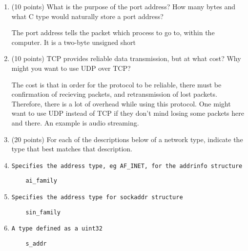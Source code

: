 \documentclass{article}[9pt]
\newenvironment{answerfont}{\fontfamily{qhv}\selectfont}{\par}
\newenvironment{myanswer}{\begin{mdframed}\begin{answerfont}}{\end{answerfont}\end{mdframed}}
\begin{document}
\begin{enumerate}
\begin{enumerate}
  \end{enumerate}

\item (10 points) What is the purpose of the port address? How many bytes and what C type would naturally store a port address?

  \begin{myanswer}
  The port address tells the packet which process to go to, within the computer. It is a two-byte unsigned short
  \end{myanswer}

\item (10 points) TCP provides reliable data transmission, but at what cost? Why might you want to use UDP over TCP?

  \begin{myanswer}
  The cost is that in order for the protocol to be reliable, there must be confirmation of recieving packets, and retransmission of lost packets. Therefore, there is a lot
  of overhead while using this protocol. One might want to use UDP instead of TCP if they don't mind losing some packets here and there. An example is audio streaming.
  \end{myanswer}

\item (20 points) For each of the descriptions below of a network type, indicate the type that best matches that description.

  \item \texttt{Specifies the address type, eg AF_INET, for the addrinfo structure}
    \begin{myanswer}\begin{verbatim}
    ai_family
    \end{verbatim}\end{myanswer}

  \item \texttt{Specifies the address type for sockaddr structure}
    \begin{myanswer}\begin{verbatim}
    sin_family
    \end{verbatim}\end{myanswer}

  \item \texttt{A type defined as a uint32}
    \begin{myanswer}\begin{verbatim}
    s_addr
    \end{verbatim}\end{myanswer}


\end{enumerate}
\end{document}
